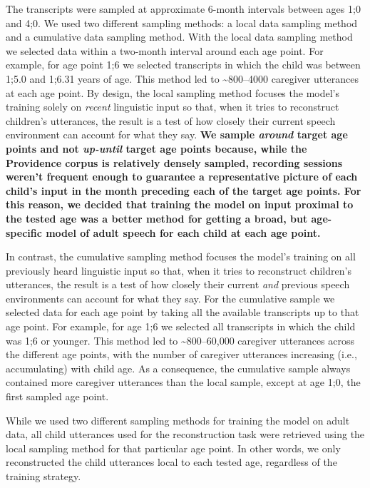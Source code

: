 \documentclass[man,mask,floatsintext]{apa6}
\begin{document}
The transcripts were sampled at approximate 6-month intervals between
ages 1;0 and 4;0. We used two different sampling methods: a local data
sampling method and a cumulative data sampling method. With the local
data sampling method we selected data within a two-month interval around
each age point. For example, for age point 1;6 we selected transcripts
in which the child was between 1;5.0 and 1;6.31 years of age. This
method led to \textasciitilde{}800--4000 caregiver utterances at each
age point. By design, the local sampling method focuses the model's
training solely on \emph{recent} linguistic input so that, when it tries
to reconstruct children's utterances, the result is a test of how
closely their current speech environment can account for what they say.
\textbf{We sample \emph{around} target age points and not
\emph{up-until} target age points because, while the Providence corpus
is relatively densely sampled, recording sessions weren't frequent
enough to guarantee a representative picture of each child's input in
the month preceding each of the target age points. For this reason, we
decided that training the model on input proximal to the tested age was
a better method for getting a broad, but age-specific model of adult
speech for each child at each age point.}

In contrast, the cumulative sampling method focuses the model's training
on all previously heard linguistic input so that, when it tries to
reconstruct children's utterances, the result is a test of how closely
their current \textit{and} previous speech environments can account for
what they say. For the cumulative sample we selected data for each age
point by taking all the available transcripts up to that age point. For
example, for age 1;6 we selected all transcripts in which the child was
1;6 or younger. This method led to \textasciitilde{}800--60,000
caregiver utterances across the different age points, with the number of
caregiver utterances increasing (i.e., accumulating) with child age. As
a consequence, the cumulative sample always contained more caregiver
utterances than the local sample, except at age 1;0, the first sampled
age point.

While we used two different sampling methods for training the model on
adult data, all child utterances used for the reconstruction task were
retrieved using the local sampling method for that particular age point.
In other words, we only reconstructed the child utterances local to each
tested age, regardless of the training strategy.
\end{document}
